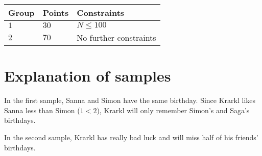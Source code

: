 \noindent
\begin{tabular}{| l | l | l |}
\hline
Group & Points & Constraints \\ \hline
$1$    & $30$         & $N \leq 100$ \\ \hline
$2$    & $70$         & No further constraints \\ \hline
\end{tabular}

\section*{Explanation of samples}
In the first sample, Sanna and Simon have the same birthday.
Since Krarkl likes Sanna less than Simon ($1 < 2$), Krarkl will only remember Simon's and Saga's birthdays.

In the second sample, Krarkl has really bad luck and will miss half of his friends' birthdays.
